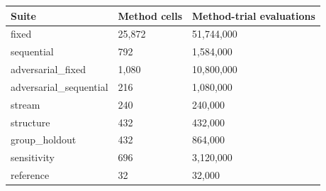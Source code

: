 \begin{tabular}{lll}
\toprule
Suite & Method cells & Method-trial evaluations \\
\midrule
fixed & 25,872 & 51,744,000 \\
sequential & 792 & 1,584,000 \\
adversarial\_fixed & 1,080 & 10,800,000 \\
adversarial\_sequential & 216 & 1,080,000 \\
stream & 240 & 240,000 \\
structure & 432 & 432,000 \\
group\_holdout & 432 & 864,000 \\
sensitivity & 696 & 3,120,000 \\
reference & 32 & 32,000 \\
\bottomrule
\end{tabular}
